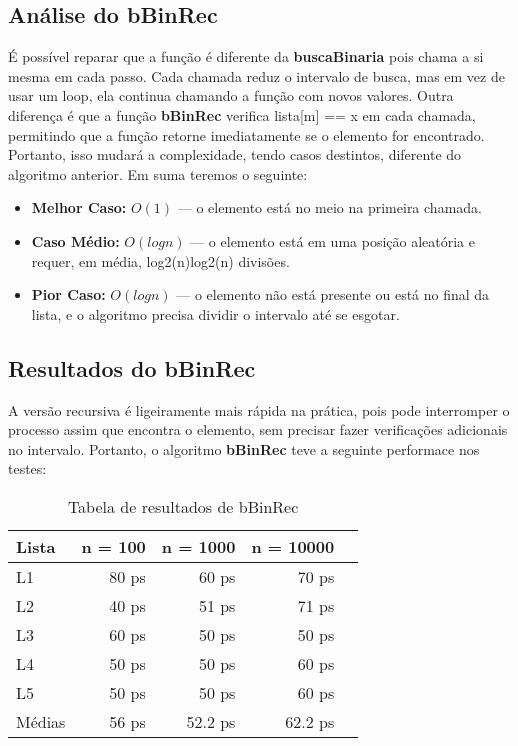 \subsection{Análise do bBinRec}

É possível reparar que a função é diferente da \textbf{buscaBinaria} pois chama a si mesma em cada passo. Cada chamada reduz o intervalo de busca, mas em vez de usar um loop, ela continua chamando a função com novos valores. Outra diferença é que a função \textbf{bBinRec} verifica lista[m] == x em cada chamada, permitindo que a função retorne imediatamente se o elemento for encontrado. Portanto, isso mudará a complexidade, tendo casos destintos, diferente do algoritmo anterior.
Em suma teremos o seguinte:

\begin{itemize}
	\item \textbf{Melhor Caso:} $O(1)$ — o elemento está no meio na primeira chamada.
	\item \textbf{Caso Médio:} $O(log n)$ — o elemento está em uma posição aleatória e requer, em média, log⁡2(n)log2​(n) divisões.
	\item \textbf{Pior Caso:} $O(logn)$ — o elemento não está presente ou está no final da lista, e o algoritmo precisa dividir o intervalo até se esgotar.
\end{itemize}

\subsection{Resultados do bBinRec}

A versão recursiva é ligeiramente mais rápida na prática, pois pode interromper o processo assim que encontra o elemento, sem precisar fazer verificações adicionais no intervalo.
Portanto, o algoritmo \textbf{bBinRec} teve a seguinte performace nos testes:

\begin{table}[h!]
	\centering
	\caption{Tabela de resultados de bBinRec}
	\label{tab:bBin_rec_result}
	\begin{tabular}{lrrrr}
		\toprule
		Lista   & n = 100   & n = 1000  & n = 10000 \\
		\midrule
		L1      & 80 ps    & 60 ps    & 70 ps  \\
		L2      & 40 ps    & 51 ps    & 71 ps  \\
		L3      & 60 ps    & 50 ps    & 50 ps  \\
		L4      & 50 ps    & 50 ps    & 60 ps  \\
		L5      & 50 ps    & 50 ps    & 60 ps  \\
		\midrule
		Médias  & 56 ps  & 52.2 ps  & 62.2 ps \\
		\bottomrule
	\end{tabular}
\end{table}

